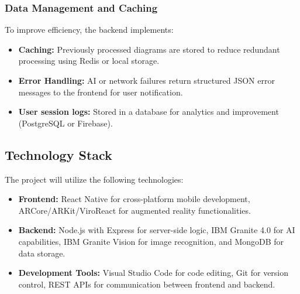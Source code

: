 \documentclass[10pt]{article}
\begin{document}
        \subsubsection{Data Management and Caching}
            To improve efficiency, the backend implements:
            \begin{itemize}
                \item \textbf{Caching:} Previously processed diagrams are stored to reduce redundant processing using Redis or local storage.
                \item \textbf{Error Handling:} AI or network failures return structured JSON error messages to the frontend for user notification.
                \item \textbf{User session logs:} Stored in a database for analytics and improvement (PostgreSQL or Firebase).
            \end{itemize}
            
    \subsection{Technology Stack}
        The project will utilize the following technologies:
        \begin{itemize}
            \item \textbf{Frontend:} React Native for cross-platform mobile development, ARCore/ARKit/ViroReact for augmented reality functionalities.
            \item \textbf{Backend:} Node.js with Express for server-side logic, IBM Granite 4.0 for AI capabilities, IBM Granite Vision for image recognition, and MongoDB for data storage.
            \item \textbf{Development Tools:} Visual Studio Code for code editing, Git for version control, REST APIs for communication between frontend and backend.
        \end{itemize}
\end{document}
